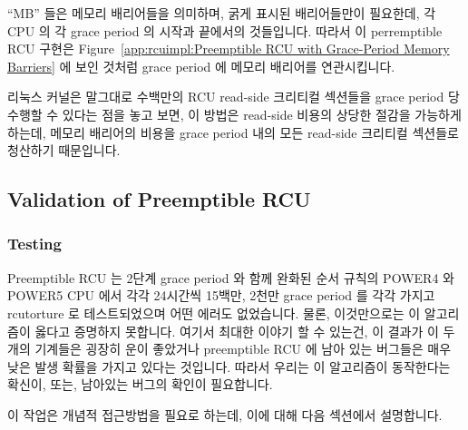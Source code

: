 ``MB'' 들은 메모리 배리어들을 의미하며, 굵게 표시된 배리어들만이 필요한데, 각
CPU 의 각 grace period 의 시작과 끝에서의 것들입니다.
따라서 이 perremptible RCU 구현은
Figure~\ref{app:rcuimpl:Preemptible RCU with Grace-Period Memory Barriers}
에 보인 것처럼 grace period 에 메모리 배리어를 연관시킵니다.

리눅스 커널은 말그대로 수백만의 RCU read-side 크리티컬 섹션들을 grace period 당
수행할 수 있다는 점을 놓고 보면, 이 방법은 read-side 비용의 상당한 절감을
가능하게 하는데, 메모리 배리어의 비용을 grace period 내의 모든 read-side
크리티컬 섹션들로 청산하기 때문입니다.

\subsection{Validation of Preemptible RCU}
\label{app:rcuimpl:Validation of Preemptible RCU}

\subsubsection{Testing}
\label{app:rcuimpl:Testing}

Preemptible RCU 는 2단계 grace period 와 함께 완화된 순서 규칙의 POWER4 와
POWER5 CPU 에서 각각 24시간씩 15백만, 2천만 grace period 를 각각 가지고
rcutorture 로 테스트되었으며 어떤 에러도 없었습니다.
물론, 이것만으로는 이 알고리즘이 옳다고 증명하지 못합니다.
여기서 최대한 이야기 할 수 있는건, 이 결과가 이 두개의 기계들은 굉장히 운이
좋았거나 preemptible RCU 에 남아 있는 버그들은 매우 낮은 발생 확률을 가지고
있다는 것입니다.
따라서 우리는 이 알고리즘이 동작한다는 확신이, 또는, 남아있는 버그의 확인이
필요합니다.

이 작업은 개념적 접근방법을 필요로 하는데, 이에 대해 다음 섹션에서 설명합니다.
\iffalse

